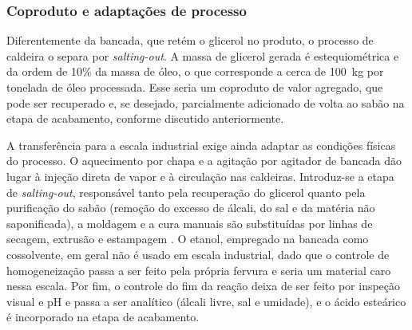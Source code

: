\subsubsection{Coproduto e adaptações de processo}

Diferentemente da bancada, que retém o glicerol no produto, o processo de caldeira o separa por \textit{salting-out}. A massa de glicerol gerada é estequiométrica e da ordem de 10\% da massa de óleo, o que corresponde a cerca de 100~kg por tonelada de óleo processada. Esse seria um coproduto de valor agregado, que pode ser recuperado e, se desejado, parcialmente adicionado de volta ao sabão na etapa de acabamento, conforme discutido anteriormente.

A transferência para a escala industrial exige ainda adaptar as condições físicas do processo. O aquecimento por chapa e a agitação por agitador de bancada dão lugar à injeção direta de vapor e à circulação nas caldeiras. Introduz-se a etapa de \textit{salting-out}, responsável tanto pela recuperação do glicerol quanto pela purificação do sabão (remoção do excesso de álcali, do sal e da matéria não saponificada), a moldagem e a cura manuais são substituídas por linhas de secagem, extrusão e estampagem \cite{shreve1984chemical}. O etanol, empregado na bancada como cossolvente, em geral não é usado em escala industrial, dado que o controle de homogeneização passa a ser feito pela própria fervura e seria um material caro nessa escala. Por fim, o controle do fim da reação deixa de ser feito por inspeção visual e pH e passa a ser analítico (álcali livre, sal e umidade), e o ácido esteárico é incorporado na etapa de acabamento.
